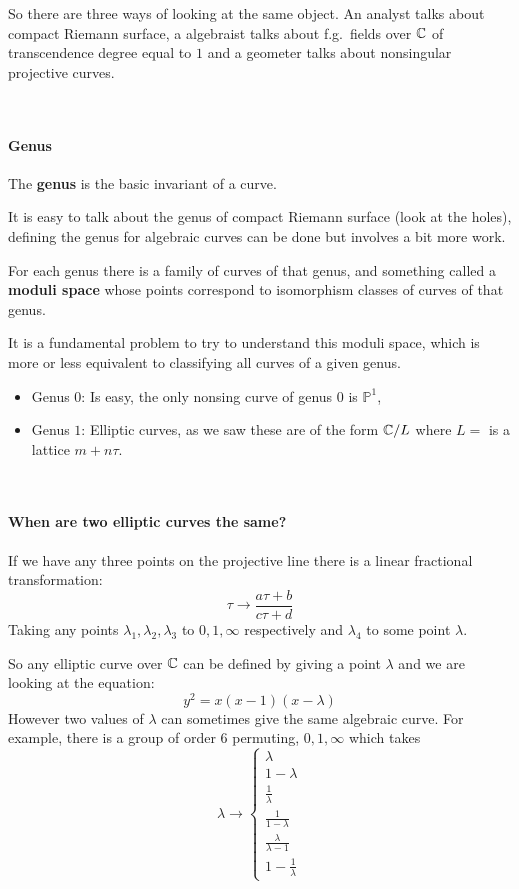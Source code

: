 So there are three ways of looking at the same object. An analyst talks about compact Riemann surface, a algebraist talks about f.g.\ fields over $\mathbb{C}$ of transcendence degree equal to $1$ and a geometer talks about nonsingular projective curves.

\

\paragraph*{Genus}
\begin{definition}
    The \textbf{genus} is the basic invariant of a curve.


    It is easy to talk about the genus of compact Riemann surface (look at the holes), defining the genus for algebraic curves can be done but involves a bit more work. 

    For each genus there is a family of curves of that genus, and something called a \textbf{moduli space} whose points correspond to isomorphism classes of curves of that genus.    
\end{definition}

It is a fundamental problem to try to understand this moduli space, which is more or less equivalent to classifying all curves of a given genus. 

\begin{itemize}
    \item Genus $0$: Is easy, the only nonsing curve of genus $0$ is $\mathbb{P}^1$,
    \item Genus $1$: Elliptic curves, as we saw these are of the form $\mathbb{C}/L$ where $L = $ is a lattice $m+n\tau$.
\end{itemize}

\

\paragraph*{When are two elliptic curves the same?}
If we have any three points on the projective line there is a linear fractional transformation:\[\tau \rightarrow \frac{a\tau + b}{c\tau + d} \]
Taking any points $\lambda_1,\lambda_2,\lambda_3$ to $0,1,\infty$ respectively and $\lambda_4$ to some point $\lambda$.

So any elliptic curve over $\mathbb{C}$ can be defined by giving a point $\lambda$ and we are looking at the equation:\[y^2 = x(x-1)(x-\lambda)\]
However two values of $\lambda$ can sometimes give the same algebraic curve. For example, there is a group of order $6$ permuting, $0,1,\infty$ which takes \[\lambda \rightarrow \begin{cases}
    \lambda\\
    1-\lambda\\
    \frac{1}{\lambda}\\
    \frac{1}{1-\lambda}\\
    \frac{\lambda}{\lambda-1}\\
    1-\frac{1}{\lambda}
\end{cases}\]

